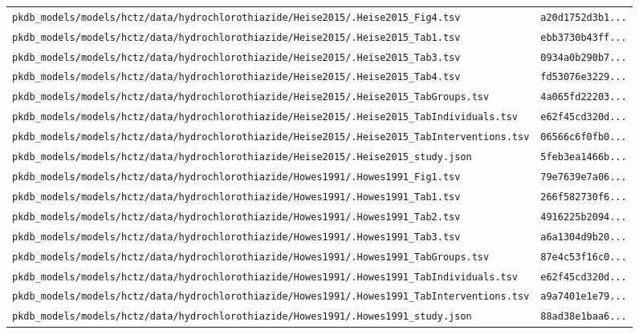 \begin{longtable}{ll}
\texttt{pkdb\_models/models/hctz/data/hydrochlorothiazide/Heise2015/.Heise2015\_Fig4.tsv} & \texttt{a20d1752d3b1...} \\
\texttt{pkdb\_models/models/hctz/data/hydrochlorothiazide/Heise2015/.Heise2015\_Tab1.tsv} & \texttt{ebb3730b43ff...} \\
\texttt{pkdb\_models/models/hctz/data/hydrochlorothiazide/Heise2015/.Heise2015\_Tab3.tsv} & \texttt{0934a0b290b7...} \\
\texttt{pkdb\_models/models/hctz/data/hydrochlorothiazide/Heise2015/.Heise2015\_Tab4.tsv} & \texttt{fd53076e3229...} \\
\texttt{pkdb\_models/models/hctz/data/hydrochlorothiazide/Heise2015/.Heise2015\_TabGroups.tsv} & \texttt{4a065fd22203...} \\
\texttt{pkdb\_models/models/hctz/data/hydrochlorothiazide/Heise2015/.Heise2015\_TabIndividuals.tsv} & \texttt{e62f45cd320d...} \\
\texttt{pkdb\_models/models/hctz/data/hydrochlorothiazide/Heise2015/.Heise2015\_TabInterventions.tsv} & \texttt{06566c6f0fb0...} \\
\texttt{pkdb\_models/models/hctz/data/hydrochlorothiazide/Heise2015/.Heise2015\_study.json} & \texttt{5feb3ea1466b...} \\
\texttt{pkdb\_models/models/hctz/data/hydrochlorothiazide/Howes1991/.Howes1991\_Fig1.tsv} & \texttt{79e7639e7a06...} \\
\texttt{pkdb\_models/models/hctz/data/hydrochlorothiazide/Howes1991/.Howes1991\_Tab1.tsv} & \texttt{266f582730f6...} \\
\texttt{pkdb\_models/models/hctz/data/hydrochlorothiazide/Howes1991/.Howes1991\_Tab2.tsv} & \texttt{4916225b2094...} \\
\texttt{pkdb\_models/models/hctz/data/hydrochlorothiazide/Howes1991/.Howes1991\_Tab3.tsv} & \texttt{a6a1304d9b20...} \\
\texttt{pkdb\_models/models/hctz/data/hydrochlorothiazide/Howes1991/.Howes1991\_TabGroups.tsv} & \texttt{87e4c53f16c0...} \\
\texttt{pkdb\_models/models/hctz/data/hydrochlorothiazide/Howes1991/.Howes1991\_TabIndividuals.tsv} & \texttt{e62f45cd320d...} \\
\texttt{pkdb\_models/models/hctz/data/hydrochlorothiazide/Howes1991/.Howes1991\_TabInterventions.tsv} & \texttt{a9a7401e1e79...} \\
\texttt{pkdb\_models/models/hctz/data/hydrochlorothiazide/Howes1991/.Howes1991\_study.json} & \texttt{88ad38e1baa6...} \\

\end{longtable}
